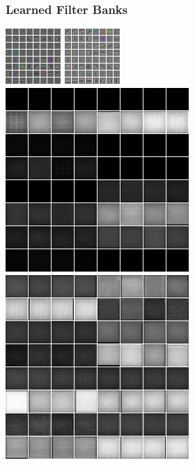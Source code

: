 \documentclass{beamer}
\begin{document}
\begin{frame}
\frametitle{Learned Filter Banks} 
\begin{center} 
\includegraphics[scale=1.0]{./images/TAE/dec_small_slow.png} \hspace{0.5cm} 
\includegraphics[scale=1.0]{./images/TAE/dec_large_slow.png} \\
\includegraphics[scale=0.3]{./images/TAE/act_small_slow.png} \hspace{0.5cm} 
\includegraphics[scale=0.3]{./images/TAE/act_large_slow.png} 
\end{center} 
\end{frame}
\end{document}
